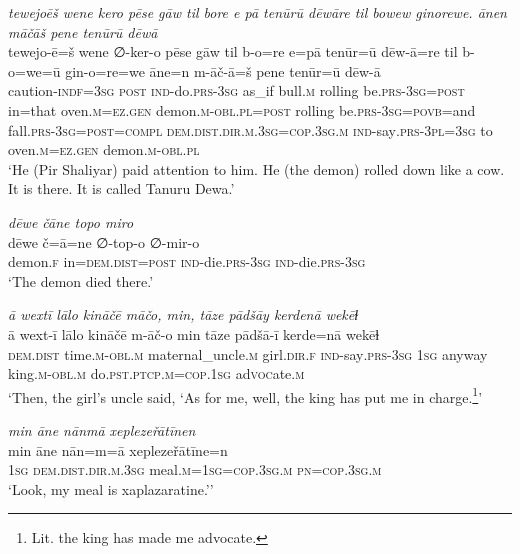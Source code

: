 \ea \label{ŽP.200}
\textit{tewejoēš wene kero pēse gāw til bore e pā tenūrū dēwāre til bowew ginorewe. ānen māčāš pene tenūrū dēwā} \\ 
\gll tewejo-ē=š wene ∅-ker-o pēse gāw til b-o=re e=pā tenūr=ū dēw-ā=re til b-o=we=ū gin-o=re=we āne=n m-āč-ā=š pene tenūr=ū dēw-ā \\ 
 caution\textsc{-indf}\textsc{=3sg} \textsc{post} \textsc{ind-}do\textsc{.prs}\textsc{-3sg} as\_if bull\textsc{.m} rolling be\textsc{.prs}\textsc{-3sg}\textsc{=\textsc{post}} in=that oven\textsc{.m}\textsc{\textsc{=ez.gen}} demon\textsc{.m}\textsc{-obl}\textsc{.pl}\textsc{=\textsc{post}} rolling be\textsc{.prs}\textsc{-3sg}\textsc{=\textsc{povb}}=and fall\textsc{.prs}\textsc{-3sg}\textsc{=\textsc{post}}\textsc{=compl} \textsc{dem.dist}\textsc{.dir}\textsc{.m}\textsc{.3sg}\textsc{=cop}\textsc{.3sg}\textsc{.m} \textsc{ind-}say\textsc{.prs}\textsc{-3pl}\textsc{=3sg} to oven\textsc{.m}\textsc{\textsc{=ez.gen}} demon\textsc{.m}\textsc{-obl}\textsc{.pl} \\ 
\glt `He (Pir Shaliyar) paid attention to him. He (the demon) rolled down like a cow. It is there. It is called Tanuru Dewa.'
\z 
 
\ea \label{ŽP.202}
\textit{dēwe čāne topo miro} \\ 
\gll dēwe č=ā=ne ∅-top-o ∅-mir-o \\ 
 demon\textsc{.f} in=\textsc{dem.dist}\textsc{=\textsc{post}} \textsc{ind-}die\textsc{.prs}\textsc{-3sg} \textsc{ind-}die\textsc{.prs}\textsc{-3sg} \\ 
\glt `The demon died there.'
\z 
 
\ea \label{ŽP.206}
\textit{ā wextī lālo kināčē māčo, min, tāze pādšāy kerdenā wekēɫ} \\ 
\gll ā wext-ī lālo kināčē m-āč-o min tāze pādšā-ī kerde=nā wekēɫ \\ 
 \textsc{dem.dist} time\textsc{.m}\textsc{-obl}\textsc{.m} maternal\_uncle\textsc{.m} girl\textsc{.dir}\textsc{.f} \textsc{ind-}say\textsc{.prs}\textsc{-3sg} \textsc{1sg} anyway king\textsc{.m}\textsc{-obl}\textsc{.m} do\textsc{.pst}\textsc{.ptcp}\textsc{.m}\textsc{=cop}\textsc{.\textsc{1sg}} ad\textsc{voc}ate\textsc{.m} \\ 
\glt `Then, the girl’s uncle said, ‘As for me, well, the king has put me in charge.\footnote{Lit. the king has made me advocate.}'
\z 
 
\ea \label{ŽP.214}
\textit{min āne nānmā xeplezeřātīnen} \\ 
\gll min āne nān=m=ā xeplezeřātīne=n \\ 
 \textsc{1sg} \textsc{dem.dist}\textsc{.dir}\textsc{.m}\textsc{.3sg} meal\textsc{.m}\textsc{=\textsc{1sg}}\textsc{=cop}\textsc{.3sg}\textsc{.m} \textsc{pn}\textsc{=cop}\textsc{.3sg}\textsc{.m} \\ 
\glt `Look, my meal is xaplazaratine.’'
\z 
 
